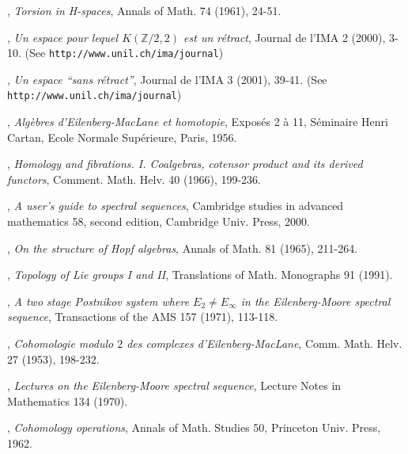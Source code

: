 \documentclass[11pt,a4paper]{amsart}
\theoremstyle{plain}
\theoremstyle{definition}
\theoremstyle{remark}
\newcommand{\Z}{\mathbb{Z}}
\begin{document}
\begin{thebibliography}{99}

, {\it Torsion in H-spaces}, Annals of Math. 74 (1961), 24-51.

, {\it Un espace pour lequel $K(\Z/2,2)$ est un r\'etract}, Journal de l'IMA 2 (2000), 3-10. (See {\tt http://www.unil.ch/ima/journal})

, {\it Un espace ``sans r\'etract''}, Journal de l'IMA 3 (2001), 39-41. (See {\tt http://www.unil.ch/ima/journal})

, {\it Alg\`ebres d'Eilenberg-MacLane et homotopie}, Expos\'es 2 \`a 11, S\'eminaire Henri Cartan, Ecole Normale Sup\'erieure, Paris, 1956. 

, {\it Homology and fibrations. I. Coalgebras, cotensor product and its derived functors}, Comment. Math. Helv. 40 (1966), 199-236.

, {\it A user's guide to spectral sequences}, Cambridge studies in advanced mathematics 58, second edition, Cambridge Univ. Press, 2000.

, {\it On the structure of Hopf algebras}, Annals of Math. 81 (1965), 211-264.

, {\it Topology of Lie groups I and II}, Translations of Math. Monographs 91 (1991).

, {\it A two stage Postnikov system where $E_2\not=E_\infty$ in the Eilenberg-Moore spectral sequence}, Transactions of the AMS 157 (1971), 113-118.

, {\it Cohomologie modulo $2$ des complexes d'Eilenberg-MacLane}, Comm. Math. Helv. 27 (1953), 198-232.

, {\it Lectures on the Eilenberg-Moore spectral sequence}, Lecture Notes in Mathematics 134 (1970).

, {\it Cohomology operations}, Annals of Math. Studies 50, Princeton Univ. Press, 1962.

\end{thebibliography}
\end{document}
